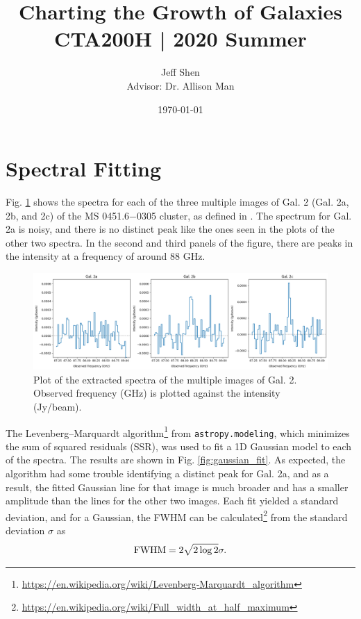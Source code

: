\documentclass[11pt]{article}
\newcommand{\code}{\texttt}
\begin{document}
\title{\textbf{Charting the Growth of Galaxies} \\[0.25cm] \large{CTA200H | 2020 Summer}}
\author{Jeff Shen \\ Advisor: Dr. Allison Man}
\date{\today}
\maketitle

\section*{Spectral Fitting}

Fig. \ref{fig:initial_spectra} shows the spectra for each of the three multiple images of Gal. 2 (Gal. 2a, 2b, and 2c) of the MS 0451.6−0305 cluster, as defined in \cite{MacKenzie2014}. The spectrum for Gal. 2a is noisy, and there is no distinct peak like the ones seen in the plots of the other two spectra. In the second and third panels of the figure, there are peaks in the intensity at a frequency of around 88 GHz. 

\begin{figure}[!htbp]
    \centering
    \includegraphics[width=\linewidth]{../figs/initial_spectra.png}
	\caption{Plot of the extracted spectra of the multiple images of Gal. 2. Observed frequency (GHz) is plotted against the intensity (Jy/beam).}
    \label{fig:initial_spectra}
\end{figure}

The Levenberg–Marquardt algorithm\footnote{\url{https://en.wikipedia.org/wiki/Levenberg-Marquardt_algorithm}} from \code{astropy.modeling}, which minimizes the sum of squared residuals (SSR), was used to fit a 1D Gaussian model to each of the spectra. The results are shown in Fig. \ref{fig:gaussian_fit}. As expected, the algorithm had some trouble identifying a distinct peak for Gal. 2a, and as a result, the fitted Gaussian line for that image is much broader and has a smaller amplitude than the lines for the other two images. Each fit yielded a standard deviation, and for a Gaussian, the FWHM can be calculated\footnote{\url{https://en.wikipedia.org/wiki/Full_width_at_half_maximum}} from the standard deviation $\sigma$ as 
\begin{align}\label{eqn:fwhm}
	\rm{FWHM} = 2\sqrt{2\log{2}}\sigma.
\end{align}
\end{document}
